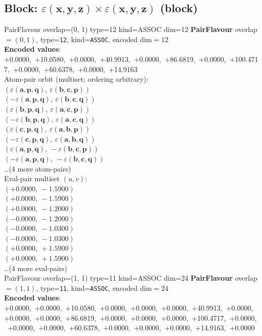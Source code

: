 \documentclass[a4paper,11pt]{article}
\newcommand{\kblbmcpggoncpf}[3]{\varepsilon(\mathbf{#1},\mathbf{#2},\mathbf{#3})}
\begin{document}
\subsection{Block: $\kblbmcpggoncpf{x}{y}{z} \times \kblbmcpggoncpf{x}{y}{z}$  (block)}
    PairFlavour  overlap=(0, 1)  type=12  kind=ASSOC  dim=12
\textbf{PairFlavour} overlap$=(0, 1)$, type=\texttt{12}, kind=\texttt{ASSOC}, encoded dim$=12$\\
\textbf{      Encoded values}: +0.0000,\ +10.0580,\ +0.0000,\ +40.9913,\ +0.0000,\ +86.6819,\ +0.0000,\ +100.4717,\ +0.0000,\ +60.6378,\ +0.0000,\ +14.9163\\
\quad Atom-pair orbit (multiset; ordering arbitrary):\\
$(\kblbmcpggoncpf{a}{p}{q},\ \kblbmcpggoncpf{b}{c}{p})$\\
$(-\kblbmcpggoncpf{a}{p}{q},\ \kblbmcpggoncpf{b}{c}{q})$\\
$(\kblbmcpggoncpf{b}{p}{q},\ \kblbmcpggoncpf{a}{c}{p})$\\
$(-\kblbmcpggoncpf{b}{p}{q},\ \kblbmcpggoncpf{a}{c}{q})$\\
$(\kblbmcpggoncpf{c}{p}{q},\ \kblbmcpggoncpf{a}{b}{p})$\\
$(-\kblbmcpggoncpf{c}{p}{q},\ \kblbmcpggoncpf{a}{b}{q})$\\
$(\kblbmcpggoncpf{a}{p}{q},\ -\kblbmcpggoncpf{b}{c}{p})$\\
$(-\kblbmcpggoncpf{a}{p}{q},\ -\kblbmcpggoncpf{b}{c}{q})$\\
\quad \ldots (4 more atom-pairs)\\
\quad Eval-pair multiset $(u, v)$:\\
$(+0.0000,\ -1.5900)$\\
$(+0.0000,\ -1.5900)$\\
$(+0.0000,\ -1.2000)$\\
$(-0.0000,\ -1.2000)$\\
$(-0.0000,\ -1.0300)$\\
$(-0.0000,\ -1.0300)$\\
$(+0.0000,\ +1.5900)$\\
$(+0.0000,\ +1.5900)$\\
\quad \ldots (4 more eval-pairs)\\
    PairFlavour  overlap=(1, 1)  type=11  kind=ASSOC  dim=24
\textbf{PairFlavour} overlap$=(1, 1)$, type=\texttt{11}, kind=\texttt{ASSOC}, encoded dim$=24$\\
\textbf{      Encoded values}: +0.0000,\ +0.0000,\ +10.0580,\ +0.0000,\ +0.0000,\ +0.0000,\ +40.9913,\ +0.0000,\ +0.0000,\ +0.0000,\ +86.6819,\ +0.0000,\ +0.0000,\ +0.0000,\ +100.4717,\ +0.0000,\ +0.0000,\ +0.0000,\ +60.6378,\ +0.0000,\ +0.0000,\ +0.0000,\ +14.9163,\ +0.0000\\
\end{document}
